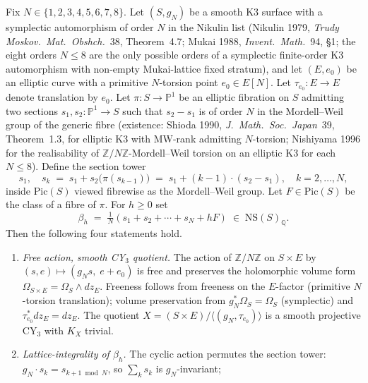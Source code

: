 \begin{proposition}[The \texorpdfstring{$\mathbb Z/N\mathbb Z$}{Z/NZ}-orbifold CY\texorpdfstring{$_3$}{-3} \texorpdfstring{$X=(S\times E)/\langle(g_N,\tau_{e_0})\rangle$}{X=(Sx E)/langle(g-N,tau-e-0)rangle}, \texorpdfstring{$E$}{E}-torsion section tower, and \texorpdfstring{$\beta_h$}{beta-h} as reduced curve class]
\label{prop:cy-c-beyond-k3e-orbifold-ZN-sections-beta-h}
Fix $N\in\{1,2,3,4,5,6,7,8\}$. Let $(S,g_N)$ be a smooth K3 surface
with a symplectic automorphism of order $N$ in the Nikulin list
(Nikulin 1979, \emph{Trudy Moskov.\ Mat.\ Obshch.}~38, Theorem~4.7;
Mukai 1988, \emph{Invent.\ Math.}~94, \S 1; the eight orders
$N\le 8$ are the only possible orders of a symplectic finite-order
K3 automorphism with non-empty Mukai-lattice fixed stratum), and let
$(E,e_0)$ be an elliptic curve with a primitive $N$-torsion point
$e_0\in E[N]$. Let $\tau_{e_0}:E\to E$ denote translation by $e_0$.
Let $\pi:S\to\mathbb P^1$ be an elliptic fibration on $S$ admitting
two sections $s_1,s_2:\mathbb P^1\to S$ such that $s_2-s_1$ is of
order $N$ in the Mordell--Weil group of the generic fibre (existence:
Shioda 1990, \emph{J.\ Math.\ Soc.\ Japan}~39, Theorem~1.3, for
elliptic K3 with $\mathrm{MW}$-rank admitting $N$-torsion; Nishiyama
1996 for the realisability of $\mathbb Z/N\mathbb Z$-Mordell--Weil
torsion on an elliptic K3 for each $N\le 8$). Define the section
tower
\[
 s_1,\quad s_k \;=\; s_1 + s_2\bigl(\pi(s_{k-1})\bigr)
 \;=\; s_1 + (k-1)\cdot(s_2 - s_1),\quad k=2,\ldots,N,
\]
inside $\mathrm{Pic}(S)$ viewed fibrewise as the Mordell--Weil group.
Let $F\in\mathrm{Pic}(S)$ be the class of a fibre of $\pi$. For
$h\ge 0$ set
\[
 \beta_h
 \;=\; \tfrac1N(s_1 + s_2 + \cdots + s_N + hF)
 \;\in\; \mathrm{NS}(S)_{\mathbb Q}.
\]
Then the following four statements hold.
\begin{enumerate}
\item \emph{Free action, smooth CY$_3$ quotient.}
The action of $\mathbb Z/N\mathbb Z$ on $S\times E$ by
$(s,e)\mapsto(g_N s,\; e + e_0)$
is free and preserves the holomorphic volume form
$\Omega_{S\times E}=\Omega_S\wedge dz_E$. Freeness follows from
freeness on the $E$-factor (primitive $N$-torsion translation);
volume preservation from $g_N^*\Omega_S=\Omega_S$ (symplectic)
and $\tau_{e_0}^*dz_E=dz_E$. The quotient
$X=(S\times E)/\langle(g_N,\tau_{e_0})\rangle$ is a smooth projective
CY$_3$ with $K_X$ trivial.
\item \emph{Lattice-integrality of $\beta_h$.}
The cyclic action permutes the section tower:
$g_N\cdot s_k = s_{k+1\bmod N}$, so $\sum_k s_k$ is $g_N$-invariant;

\end{enumerate}
\end{proposition}
